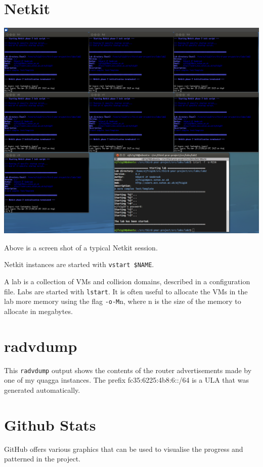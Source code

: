 \chapter{Netkit}
\begin{center}
	\includegraphics[width=\linewidth]{../Diagrams/Netkit/NetkitScreenshot.png}
\end{center}

Above is a screen shot of a typical Netkit session.  

Netkit instances are started with \texttt{vstart \$NAME}.

A lab is a collection of VMs and collision domains, described in a
configuration file. Labs are started with \texttt{lstart}. It is often useful
to allocate the VMs in the lab more memory using the flag \texttt{-o-M}n, where
n is the size of the memory to allocate in megabytes.

\chapter{radvdump}
\label{radvdump}
This \texttt{radvdump} output shows the contents of the router advertisements
made by one of my quagga instances. The prefix fc35:6225:4b8:6::/64 is a ULA
that was generated automatically.



\chapter{Github Stats}
\label{GithubStats}
GitHub offers various graphics that can be used to visualise the progress and
patterned in the project. 

